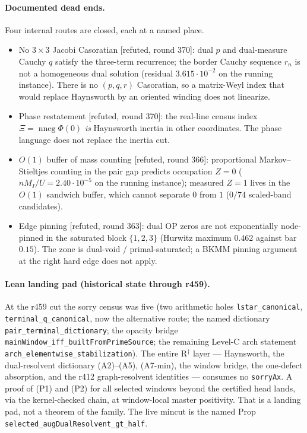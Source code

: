 \documentclass[11pt]{article}
\theoremstyle{remark}
\newcommand{\gr}[1]{\textnormal{\small[#1]}}
\begin{document}
\paragraph{Documented dead ends.}
Four internal routes are closed, each at a named place.
\begin{itemize}
\item
No $3\times3$ Jacobi Casoratian \gr{refuted, round 370}: dual $p$
and dual-measure Cauchy $q$ satisfy the three-term recurrence; the
border Cauchy sequence $r_{n}$ is not a homogeneous dual solution
(residual $3.615\cdot10^{-2}$ on the running instance).  There is
no $(p,q,r)$ Casoratian, so a matrix-Weyl index that would replace
Haynsworth by an oriented winding does not linearize.
\item
Phase restatement \gr{refuted, round 370}: the real-line census
index $\Xi=\operatorname{nneg}\Phi(0)$ \emph{is} Haynsworth inertia
in other coordinates.  The phase language does not replace the
inertia cut.
\item
$O(1)$ buffer of mass counting \gr{refuted, round 366}: proportional
Markov--Stieltjes counting in the pair gap predicts occupation
$Z=0$ ($nM_{I}/U=2.40\cdot10^{-5}$ on the running instance);
measured $Z=1$ lives in the $O(1)$ sandwich buffer, which cannot
separate $0$ from $1$ ($0/74$ scaled-band candidates).
\item
Edge pinning \gr{refuted, round 363}: dual OP zeros are not
exponentially node-pinned in the saturated block $\{1,2,3\}$
(Hurwitz maximum $0.462$ against bar $0.15$).  The zone is
dual-void / primal-saturated; a BKMM pinning argument at the
right hard edge does not apply.
\end{itemize}

\paragraph{Lean landing pad (historical state through r459).}
At the r459 cut the sorry census was five (two arithmetic holes
\texttt{lstar\_canonical}, \texttt{terminal\_q\_canonical}, now
the alternative route; the named dictionary
\texttt{pair\_terminal\_dictionary}; the opacity bridge
\texttt{mainWindow\_iff\_builtFromPrimeSource}; the remaining
Level-C arch statement
\texttt{arch\_elementwise\_stabilization}).
The entire R$^{\dagger}$ layer --- Haynsworth, the dual-resolvent
dictionary (A2)--(A5), (A7-min), the window bridge, the one-defect
absorption, and the r412 graph-resolvent identities --- consumes
no \texttt{sorryAx}.  A proof of (P1) and (P2) for all selected
windows beyond the certified head lands, via the kernel-checked
chain, at window-local master positivity.  That is a landing pad,
not a theorem of the family.  The live mincut is the named Prop
\texttt{selected\_augDualResolvent\_gt\_half}.
\end{document}
